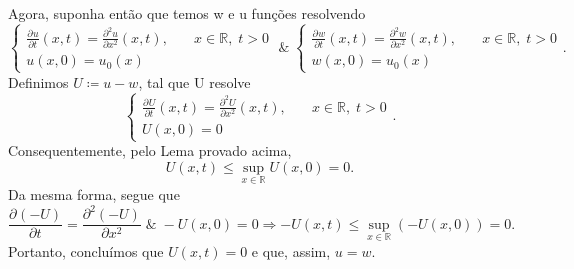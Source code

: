 \documentclass[../pde_notes.tex]{subfiles}
\begin{document}
\begin{proof*}
	Agora, suponha então que temos w e u funções resolvendo
	\[
		\left\{\begin{array}{ll}
			\frac{\partial^{}u}{\partial t^{}}(x, t) = \frac{\partial^{2}u}{\partial x^{2}} (x, t), & \quad x\in \mathbb{R},\; t > 0 \\
			u(x, 0) = u_{0}(x)
		\end{array}\right.
		\;\&\; \left\{\begin{array}{ll}
			\frac{\partial^{}w}{\partial t^{}}(x, t) = \frac{\partial^{2}w}{\partial x^{2}} (x, t), & \quad x\in \mathbb{R},\; t > 0 \\
			w(x, 0) = u_{0}(x)
		\end{array}\right..
	\]
	Definimos \(U\coloneqq u-w\), tal que U resolve
	\[
		\left\{\begin{array}{ll}
			\frac{\partial^{}U}{\partial t^{}}(x, t) = \frac{\partial^{2}U}{\partial x^{2}}(x, t), & \quad x\in \mathbb{R},\; t>0 \\
			U(x, 0) = 0
		\end{array}\right..
	\]
	Consequentemente, pelo Lema provado acima,
	\[
		U(x, t) \leq \sup_{x\in \mathbb{R}}U(x, 0) = 0.
	\]
	Da mesma forma, segue que
	\[
		\frac{\partial^{}(-U)}{\partial t^{}} = \frac{\partial^{2}(-U)}{\partial x^{2}}\;\&\; -U(x, 0) = 0 \Rightarrow -U(x, t)\leq \sup_{x\in \mathbb{R}}(-U(x, 0)) = 0.
	\]
	Portanto, concluímos que \(U(x, t) = 0\) e que, assim, \(u = w\). \qedsymbol
\end{proof*}
\end{document}
